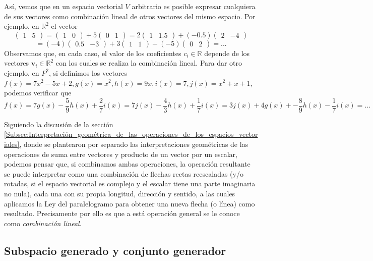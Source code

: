 \documentclass[apuntes]{subfiles}
\begin{document}
Así, vemos que en un espacio vectorial $V$ arbitrario es posible expresar cualquiera de sus vectores como combinación lineal de otros vectores del mismo espacio. Por ejemplo, en $\mathbb{R}^2$ el vector $$\begin{pmatrix} 1 & 5 \end{pmatrix} = \begin{pmatrix} 1 & 0 \end{pmatrix} + 5\begin{pmatrix} 0 & 1 \end{pmatrix} = 2\begin{pmatrix} 1 & 1.5 \end{pmatrix} + (-0.5)\begin{pmatrix} 2 & -4 \end{pmatrix} $$ $$ = (-4)\begin{pmatrix} 0.5 & -3 \end{pmatrix} + 3\begin{pmatrix} 1 & 1 \end{pmatrix} + (-5)\begin{pmatrix} 0 & 2 \end{pmatrix} = ...$$ \noindent Observamos que, en cada caso, el valor de los coeficientes $c_i\in\mathbb{R}$ depende de los vectores $\mathbf{v}_i\in\mathbb{R}^2$ con los cuales se realiza la combinación lineal. Para dar otro ejemplo, en $P^2$, si definimos los vectores $f(x) = 7x^2 - 5x + 2, g(x) = x^2, h(x) = 9x, i(x)=7, j(x)=x^2 + x + 1$, podemos verificar que $$f(x) = 7g(x)-\frac{5}{9}h(x)+\frac{2}{7}i(x)=7j(x)-\frac{4}{3}h(x)+\frac{1}{7}i(x)=3j(x)+4g(x)+-\frac{8}{9}h(x)-\frac{1}{7}i(x)=...$$

Siguiendo la discusión de la sección \ref{Subsec:Interpretación_geométrica_de_las_operaciones_de_los_espacios_vectoriales}, donde se plantearon por separado las interpretaciones geométricas de las operaciones de suma entre vectores y producto de un vector por un escalar, podemos pensar que, si combinamos ambas operaciones, la operación resultante se puede interpretar como una combinación de flechas rectas reescaladas (y/o rotadas, si el espacio vectorial es complejo y el escalar tiene una parte imaginaria no nula), cada una con su propia longitud, dirección y sentido, a las cuales aplicamos la Ley del paralelogramo para obtener una nueva flecha (o línea) como resultado. Precisamente por ello es que a está operación general se le conoce como \emph{combinación lineal}.

\newpage
\subsection*{Subspacio generado y conjunto generador} \label{Subsec:Espacio_generado_y_conjunto_generador}
\end{document}
